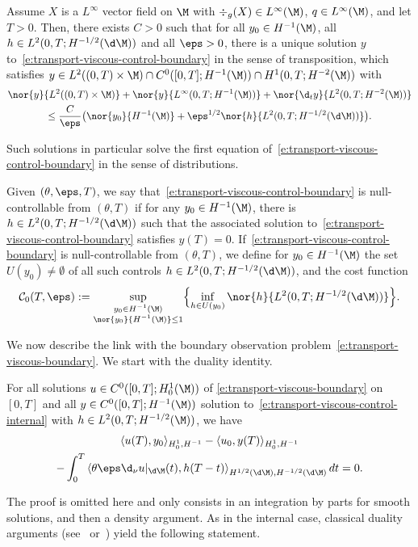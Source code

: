 \begin{lemma}
Assume $X$ is a $L^\infty$ vector field on $\M$ with $\div_{g}(X) \in L^\infty(\M)$, $q \in L^\infty(\M)$, and let $T>0$. Then, there exists $C>0$ such that for all $y_0 \in H^{-1}(\M)$, all $h \in L^2(0,T ; H^{-1/2}(\d\M))$ and all $\eps>0$, there is a unique solution $y$ to~\eqref{e:transport-viscous-control-boundary} in the sense of transposition, which satisfies $y \in L^2((0,T)\times \M) \cap C^0([0,T]; H^{-1}(\M)) \cap H^1(0,T ; H^{-2}(\M))$ with
\begin{multline*}
\nor{y}{L^2((0,T)\times \M)} + \nor{y}{L^\infty(0,T; H^{-1}(\M))} + \nor{\d_t y}{L^2(0,T ; H^{-2}(\M))} \\
\leq \frac{C}{\eps} \bigl( \nor{y_0}{H^{-1}(\M)}+ \eps^{1/2} \nor{h}{L^2(0,T ; H^{-1/2}(\d\M))}\bigr).
\end{multline*}
\end{lemma}
Such solutions in particular solve the first equation of~\eqref{e:transport-viscous-control-boundary} in the sense of distributions.
\begin{definition}
Given $(\theta, \eps, T)$, we say that~\eqref{e:transport-viscous-control-boundary} is null-controllable from $(\theta, T)$ if for any $y_0 \in H^{-1}(\M)$, there is $h \in L^2(0,T; H^{-1/2}(\d\M))$ such that the associated solution to~\eqref{e:transport-viscous-control-boundary} satisfies $y(T) =0$.
If~\eqref{e:transport-viscous-control-boundary} is null-controllable from $(\theta, T)$, we define for $y_0 \in H^{-1}(\M)$ the set $U(y_0) \neq \emptyset$ of all such controls $h \in L^2(0,T; H^{-1/2}(\d\M))$, and the cost function
\[
\mathcal{C}_0(T,\eps) := \sup_{\substack{y_0 \in H^{-1}(\M)\\ \nor{y_0}{H^{-1}(\M)}\leq 1}} \Bigl\{\inf_{h \in U(y_0)} \nor{h}{L^2(0,T; H^{-1/2}(\d\M))} \Bigr\}.
\]
\end{definition}

We now describe the link with the boundary observation problem~\eqref{e:transport-viscous-boundary}.
We start with the duality identity.
\begin{lemma}
For all solutions $u \in C^0([0,T]; H^1_0(\M))$ of \eqref{e:transport-viscous-boundary} on $[0,T]$ and all $y\in C^0([0,T]; H^{-1}(\M))$ solution to~\eqref{e:transport-viscous-control-internal} with $h \in L^2(0,T; H^{-1/2}(\M))$, we have
\begin{multline*}
\langle u(T), y_0\rangle_{H^1_0, H^{-1}} - \langle u_0, y(T)\rangle_{H^1_0, H^{-1}} \\
- \int_0^T \left\langle \theta \eps \d_{\nu}u|_{\d\M}(t), h(T-t) \right\rangle_{H^{1/2}(\d\M),H^{-1/2}(\d\M)} dt =0.
\end{multline*}
\end{lemma}
The proof is omitted here and only consists in an integration by parts for smooth solutions, and then a density argument.
As in the internal case, classical duality arguments (see~\cite{DR:77} or~\cite[Chap.\,2.3]{Cor:book}) yield the following statement.

